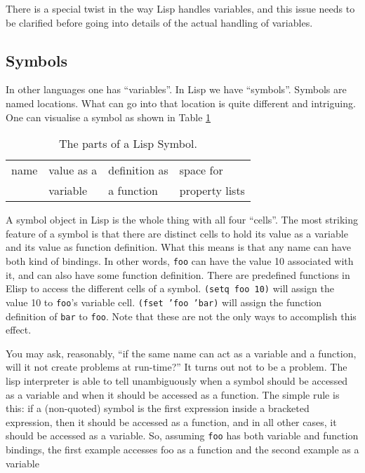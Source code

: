 \documentclass[10pt]{article}
\begin{document}
There is a special twist in the way Lisp handles variables, and this issue
needs to be clarified before going into details of the actual handling of
variables.

\subsection{Symbols}

In other languages one has ``variables''.  In Lisp we have ``symbols''.
Symbols are named locations.  What can go into that location is quite different
and intriguing.  One can visualise a symbol as shown in Table \ref{tab:sym}

\begin{table}[tb]
  \centering
  \begin{tabular}{|l|l|l|l|} \hline
    name &  value as a  &  definition as & space for      \\
         &  variable    &  a function    & property lists \\ \hline
  \end{tabular}
  \caption{The parts of a Lisp Symbol.}
  \label{tab:sym}
\end{table}

A symbol object in Lisp is the whole thing with all four ``cells''.  The most
striking feature of a symbol is that there are distinct cells to hold its value
as a variable and its value as function definition.  What this means is that
any name can have both kind of bindings.  In other words, \texttt{foo} can have
the value 10 associated with it, and can also have some function definition.
There are predefined functions in Elisp to access the different cells of a
symbol.  \texttt{(setq foo 10)} will assign the value 10 to \texttt{foo}'s
variable cell.  \texttt{(fset 'foo 'bar)} will assign the function definition
of \texttt{bar} to \texttt{foo}.  Note that these are not the only ways to
accomplish this effect.

You may ask, reasonably, ``if the same name can act as a variable and a
function, will it not create problems at run-time?''  It turns out not to be a
problem.  The lisp interpreter is able to tell unambiguously when a symbol
should be accessed as a variable and when it should be accessed as a function.
The simple rule is this: if a (non-quoted) symbol is the first expression
inside a bracketed expression, then it should be accessed as a function, and in
all other cases, it should be accessed as a variable.  So, assuming
\texttt{foo} has both variable and function bindings, the first example
accesses foo as a function and the second example as a variable
\end{document}

